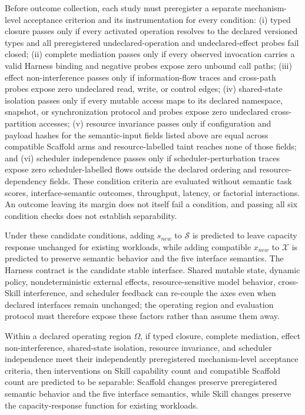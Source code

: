 Before outcome collection, each study must preregister a separate mechanism-level acceptance criterion and its instrumentation for every condition: (i) typed closure passes only if every activated operation resolves to the declared versioned types and all preregistered undeclared-operation and undeclared-effect probes fail closed; (ii) complete mediation passes only if every observed invocation carries a valid Harness binding and negative probes expose zero unbound call paths; (iii) effect non-interference passes only if information-flow traces and cross-path probes expose zero undeclared read, write, or control edges; (iv) shared-state isolation passes only if every mutable access maps to its declared namespace, snapshot, or synchronization protocol and probes expose zero undeclared cross-partition accesses; (v) resource invariance passes only if configuration and payload hashes for the semantic-input fields listed above are equal across compatible Scaffold arms and resource-labelled taint reaches none of those fields; and (vi) scheduler independence passes only if scheduler-perturbation traces expose zero scheduler-labelled flows outside the declared ordering and resource-dependency fields. These condition criteria are evaluated without semantic task scores, interface-semantic outcomes, throughput, latency, or factorial interactions. An outcome leaving its margin does not itself fail a condition, and passing all six condition checks does not establish separability.

Under these candidate conditions, adding $s_{new}$ to $\mathcal{S}$ is predicted to leave capacity response unchanged for existing workloads, while adding compatible $x_{new}$ to $\mathcal{X}$ is predicted to preserve semantic behavior and the five interface semantics. The Harness contract is the candidate stable interface. Shared mutable state, dynamic policy, nondeterministic external effects, resource-sensitive model behavior, cross-Skill interference, and scheduler feedback can re-couple the axes even when declared interfaces remain unchanged; the operating region and evaluation protocol must therefore expose these factors rather than assume them away.

\begin{proposition}
\label{prop:p1}
Within a declared operating region $\Omega$, if typed closure, complete mediation, effect non-interference, shared-state isolation, resource invariance, and scheduler independence meet their independently preregistered mechanism-level acceptance criteria, then interventions on Skill capability count and compatible Scaffold count are predicted to be separable: Scaffold changes preserve preregistered semantic behavior and the five interface semantics, while Skill changes preserve the capacity-response function for existing workloads.
\end{proposition}

